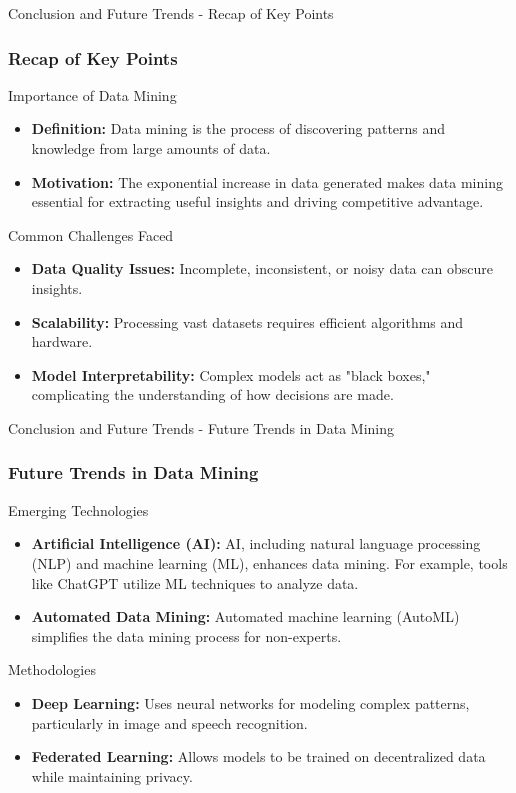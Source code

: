 \documentclass[aspectratio=169]{beamer}
\begin{document}
\begin{frame}[fragile]{Conclusion and Future Trends - Recap of Key Points}
    \frametitle{Recap of Key Points}
    \begin{block}{Importance of Data Mining}
        \begin{itemize}
            \item \textbf{Definition:} Data mining is the process of discovering patterns and knowledge from large amounts of data.
            \item \textbf{Motivation:} The exponential increase in data generated makes data mining essential for extracting useful insights and driving competitive advantage.
        \end{itemize}
    \end{block}
    
    \begin{block}{Common Challenges Faced}
        \begin{itemize}
            \item \textbf{Data Quality Issues:} Incomplete, inconsistent, or noisy data can obscure insights.
            \item \textbf{Scalability:} Processing vast datasets requires efficient algorithms and hardware.
            \item \textbf{Model Interpretability:} Complex models act as "black boxes," complicating the understanding of how decisions are made.
        \end{itemize}
    \end{block}
\end{frame}

\begin{frame}[fragile]{Conclusion and Future Trends - Future Trends in Data Mining}
    \frametitle{Future Trends in Data Mining}
    \begin{block}{Emerging Technologies}
        \begin{itemize}
            \item \textbf{Artificial Intelligence (AI):} AI, including natural language processing (NLP) and machine learning (ML), enhances data mining. For example, tools like ChatGPT utilize ML techniques to analyze data.
            \item \textbf{Automated Data Mining:} Automated machine learning (AutoML) simplifies the data mining process for non-experts.
        \end{itemize}
    \end{block}
    
    \begin{block}{Methodologies}
        \begin{itemize}
            \item \textbf{Deep Learning:} Uses neural networks for modeling complex patterns, particularly in image and speech recognition.
            \item \textbf{Federated Learning:} Allows models to be trained on decentralized data while maintaining privacy.
        \end{itemize}
    \end{block}
\end{frame}
\end{document}
